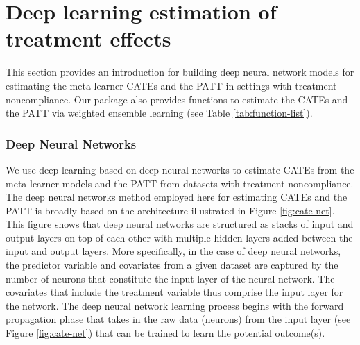 \begin{table}[!h]
    \centering
    \label{tab:pseudopatt}
\end{table}

\section{Deep learning estimation of treatment effects}\label{deep-learning-estimation-of-treatment-effects}

This section provides an introduction for building deep neural network
models for estimating the meta-learner CATEs and the PATT in settings
with treatment noncompliance. Our package also provides functions to
estimate the CATEs and the PATT via weighted ensemble learning (see
Table \ref{tab:function-list}).

\subsubsection{Deep Neural Networks}\label{deep-neural-networks}

We use deep learning based on deep neural networks to estimate CATEs
from the meta-learner models and the PATT from datasets with treatment
noncompliance. The deep neural networks method employed here for
estimating CATEs and the PATT is broadly based on the architecture
illustrated in Figure \ref{fig:cate-net}. This figure shows that deep neural networks are
structured as stacks of input and output layers on top of each other
with multiple hidden layers added between the input and output layers.
More specifically, in the case of deep neural networks, the predictor
variable and covariates from a given dataset are captured by the number
of neurons that constitute the input layer of the neural network. The
covariates that include the treatment variable thus comprise the input
layer for the network. The deep neural network learning process begins
with the forward propagation phase that takes in the raw data (neurons)
from the input layer (see Figure \ref{fig:cate-net}) that can be trained to learn the
potential outcome(s).

